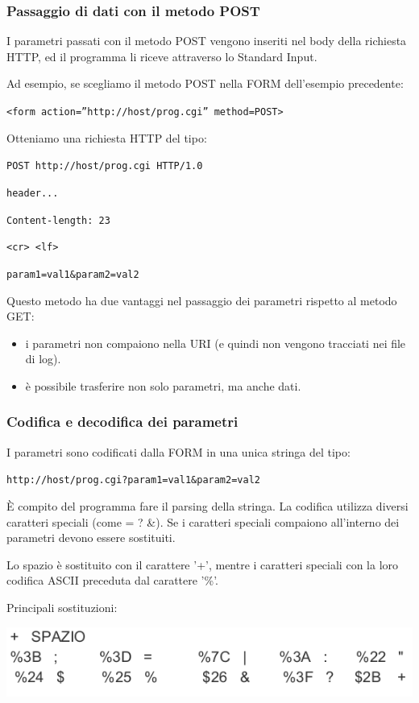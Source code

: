         \subsubsection{Passaggio di dati con il metodo POST}
            I parametri passati con il metodo POST vengono inseriti nel body della richiesta HTTP, ed il programma li riceve attraverso lo Standard Input.
        
            Ad esempio, se scegliamo il metodo POST nella FORM dell'esempio precedente:

            \verb-<form action=”http://host/prog.cgi” method=POST>-

            Otteniamo una richiesta HTTP del tipo:

            \verb-POST http://host/prog.cgi HTTP/1.0-

            \verb:header...:

            \verb=Content-length: 23=

            \verb:<cr> <lf>:

            \verb:param1=val1&param2=val2:

            Questo metodo ha due vantaggi nel passaggio dei parametri rispetto al metodo GET:
            \begin{itemize}
                \item i parametri non compaiono nella URI (e quindi non vengono tracciati nei file di log).
                \item è possibile trasferire non solo parametri, ma anche dati.
            \end{itemize}

        \subsubsection{Codifica e decodifica dei parametri}
            I parametri sono codificati dalla FORM in una unica stringa del tipo:

            \verb-http://host/prog.cgi?param1=val1&param2=val2-

            È compito del programma fare il parsing della stringa. La codifica utilizza diversi caratteri speciali (come = ? \&). Se i caratteri speciali compaiono all'interno dei parametri devono essere sostituiti.

            Lo spazio è sostituito con il carattere '+', mentre i caratteri speciali con la loro codifica ASCII preceduta dal carattere '\%'.

            Principali sostituzioni:
            \begin{center}
                \includegraphics[scale=0.4]{chapters/6/assets/schema_u.png}
            \end{center}

